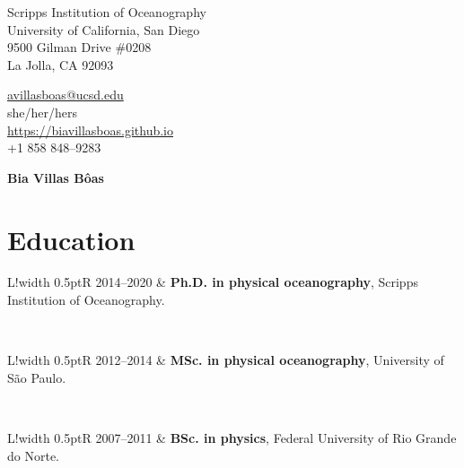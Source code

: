 \documentclass[10pt]{article}
\newcommand\VRule{\color{lightgray}\vrule width 0.5pt}
\begin{document}
\pagestyle{empty}
\begin{minipage}[ht]{0.48\textwidth}
\begin{flushleft}
\small{Scripps Institution of Oceanography} \\
\small{University of California, San Diego}\\
\small{9500 Gilman Drive \#0208} \\
\small{La Jolla, CA 92093} \\
\end{flushleft}
\end{minipage}
\hfill
\begin{minipage}[ht]{0.35\textwidth}
\begin{flushleft}
\noindent \href{mailto:avillasboas@ucsd.edu}{avillasboas@ucsd.edu}  \\
she/her/hers  \\
{\url{https://biavillasboas.github.io} } \\
\small{+1 858 848--9283}  \\
\end{flushleft}
\end{minipage}


\vspace{.5cm}
\begin{center}
	{\bfseries\Huge Bia Villas B\^{o}as}
\end{center}
\vspace{.5cm}

\section*{Education}
\vspace{.3cm}
\begin{tabular}{L!{\VRule}R}
\textsc{2014--2020} & \textbf{Ph.D. in physical oceanography}, Scripps Institution of Oceanography. \\ 
\end{tabular}
\\[10pt]
\begin{tabular}{L!{\VRule}R}
\textsc{2012--2014} & \textbf{MSc. in physical oceanography}, University of São Paulo. \\ 
\end{tabular}
\\[10pt]
\begin{tabular}{L!{\VRule}R}
\textsc{2007--2011} & \textbf{BSc. in physics}, Federal University of Rio Grande do Norte. \\
\end{tabular}
\end{document}
